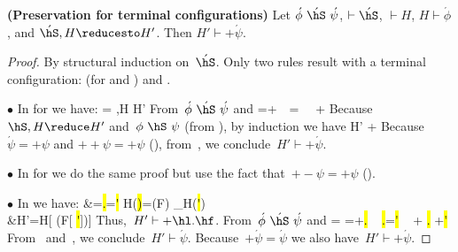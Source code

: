 \begin{lemma}  \textbf{(Preservation for terminal configurations)}
\label{Lemma:Preservation1}
Let $\acute{\phi}~\acute{\hS}~\acute{\psi}$, $\vdash \acute{\hS}$, $\vdash H$, $H \vdash \acute{\phi}$, and $\acute{\hS},H \reducesto H'$.
Then $H' \vdash +\acute{\psi}$.
\end{lemma}
\begin{proof}
By structural induction on~$\acute{\hS}$.
Only two rules result with a terminal configuration:
     (for \hfinish and \hasync)
    and .


$\bullet$
In  for \hfinish we have:
    \acute{\hS}=\finish{\hS} \gap \hS,H \reduce H'
\eeq
From~$\acute{\phi}~\acute{\hS}~\acute{\psi}$ and 
    \acute{\psi}=+\psi \gap \phi~\hS~\psi \gap \acute{\phi}=\phi \gap \phi~\finish{\hS}~ +\psi
\eeq
Because $\hS,H \reduce H'$ and~$\phi~\hS~\psi$ (from ), by induction we have
    H' \vdash +\psi
\eeq
Because~$\acute{\psi}=+\psi$ and $++\psi=+\psi$ (), from~, we conclude~$H' \vdash +\acute{\psi}$.

$\bullet$
In  for \hasync we do the same proof but use the fact that~$+-\psi=+\psi$ ().

$\bullet$
In  we have:
    &\acute{\hS}=\hl.\hf=\hl' \gap H(\hl)=\hC(F) \gap \cooked_H(\hl')
    \\
    &H'=H[ \hl \mapsto \hC(F[ \hf \mapsto \hl'])]
\eeq
Thus,~$H' \vdash +\hl.\hf$.
From~$\acute{\phi}~\acute{\hS}~\acute{\psi}$ and 
    \acute{\phi}=\phi
    \gap
    \acute{\psi}=+\hl.\hf
    \gap
    \phi ~ \hl.\hf=\hl' ~ + \hl.\hf
    \gap
    \phi \vdash +\hl'
\eeq
From~ and~, we conclude~$H' \vdash \acute{\psi}$.
Because~$+\acute{\psi}=\acute{\psi}$ we also have~$H' \vdash +\acute{\psi}$.
\end{proof}


